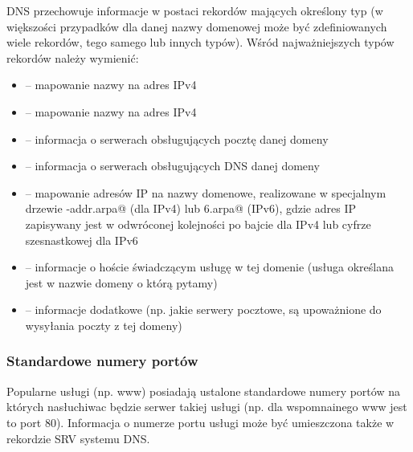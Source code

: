 DNS przechowuje informacje w postaci rekordów mających określony typ (w większości przypadków dla danej nazwy domenowej może być zdefiniowanych wiele rekordów, tego samego lub innych typów).
Wśród najważniejszych typów rekordów należy wymienić:
\begin{itemize}
	\item \Verb@A@    – mapowanie nazwy na adres IPv4
	\item \Verb@AAAA@ – mapowanie nazwy na adres IPv4
	\item \Verb@MX@   – informacja o serwerach obsługujących pocztę danej domeny
	\item \Verb@NS@   – informacja o serwerach obsługujących DNS danej domeny
	\item \Verb@PTR@  – mapowanie adresów IP na nazwy domenowe, realizowane w specjalnym drzewie \Verb@in-addr.arpa@ (dla IPv4) lub \Verb@ip6.arpa@ (IPv6),
	                    gdzie adres IP zapisywany jest w odwróconej kolejności po bajcie dla IPv4 lub cyfrze szesnastkowej dla IPv6
	\item \Verb@SRV@  – informacje o hoście świadczącym usługę w tej domenie (usługa określana jest w nazwie domeny o którą pytamy)
	\item \Verb@TXT@  – informacje dodatkowe (np. jakie serwery pocztowe, są upoważnione do wysyłania poczty z tej domeny)
\end{itemize}

\subsubsection{Standardowe numery portów}

Popularne usługi (np. www) posiadają ustalone standardowe numery portów na których nasłuchiwac będzie serwer takiej usługi (np. dla wspomnainego www jest to port 80). Informacja o numerze portu usługi może być umieszczona także w rekordzie SRV systemu DNS.
